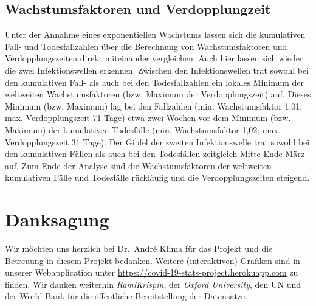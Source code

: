 \documentclass[12pt, a4paper]{article}
\begin{document}
\subsection{Wachstumsfaktoren und Verdopplungzeit}
Unter der Annahme eines exponentiellen Wachstums lassen sich die kumulativen Fall- und Todesfallzahlen über die Berechnung von Wachstumsfaktoren und Verdopplungszeiten direkt miteinander vergleichen. Auch hier lassen sich wieder die zwei Infektionswellen erkennen. Zwischen den Infektionswellen trat sowohl bei den kumulativen Fall- als auch bei den Todesfallzahlen ein lokales Minimum der weltweiten Wachstumsfaktoren (bzw. Maximum der Verdopplungszeit) auf. Dieses Minimum (bzw. Maximum) lag bei den Fallzahlen (min. Wachstumsfaktor 1,01; max. Verdopplungszeit 71 Tage) etwa zwei Wochen vor dem Minimum (bzw. Maximum) der kumulativen Todesfälle (min. Wachstumsfaktor 1,02; max. Verdopplungszeit 31 Tage). Der Gipfel der zweiten Infektionswelle trat sowohl bei den kumulativen Fällen als auch bei den Todesfällen zeitgleich Mitte-Ende März auf.
Zum Ende der Analyse sind die Wachstumsfaktoren der weltweiten kumulativen Fälle und Todesfälle rückläufig und die Verdopplungszeiten steigend. 

\newpage

\section{Danksagung}
Wir möchten uns herzlich bei Dr.\ Andr\'{e} Klima für das Projekt und die Betreuung in diesem Projekt bedanken. Weitere (interaktiven) Grafiken sind in unserer Webapplication unter \url{https://covid-19-stats-project.herokuapp.com} zu finden. Wir danken weiterhin \emph{RamiKrispin}, der \emph{Oxford University}, den UN und der World Bank für die öffentliche Bereitstellung der Datensätze. 

\newpage



\end{document}
